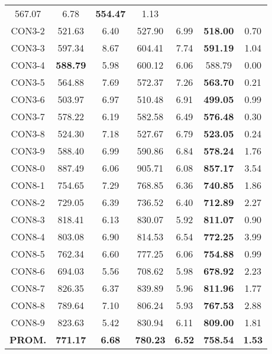 \begin{table}[ht]
\begin{tabular}{c c c c c c c}
567.07 & 6.78 & \bf{554.47} & 
1.13\\CON3-2 & 521.63 & 6.40 & 
527.90 & 6.99 & \bf{518.00} & 
0.70\\CON3-3 & 597.34 & 8.67 & 
604.41 & 7.74 & \bf{591.19} & 
1.04\\CON3-4 & \bf{588.79} & 5.98 & 
600.12 & 6.06 & 588.79 & 0.00\\
CON3-5 & 564.88 & 7.69 & 
572.37 & 7.26 & \bf{563.70} & 
0.21\\CON3-6 & 503.97 & 6.97 & 
510.48 & 6.91 & \bf{499.05} & 
0.99\\CON3-7 & 578.22 & 6.19 & 
582.58 & 6.49 & \bf{576.48} & 
0.30\\CON3-8 & 524.30 & 7.18 & 
527.67 & 6.79 & \bf{523.05} & 
0.24\\CON3-9 & 588.40 & 6.99 & 
590.86 & 6.84 & \bf{578.24} & 
1.76\\CON8-0 & 887.49 & 6.06 & 
905.71 & 6.08 & \bf{857.17} & 
3.54\\CON8-1 & 754.65 & 7.29 & 
768.85 & 6.36 & \bf{740.85} & 
1.86\\CON8-2 & 729.05 & 6.39 & 
736.52 & 6.40 & \bf{712.89} & 
2.27\\CON8-3 & 818.41 & 6.13 & 
830.07 & 5.92 & \bf{811.07} & 
0.90\\CON8-4 & 803.08 & 6.90 & 
814.53 & 6.54 & \bf{772.25} & 
3.99\\CON8-5 & 762.34 & 6.60 & 
777.25 & 6.06 & \bf{754.88} & 
0.99\\CON8-6 & 694.03 & 5.56 & 
708.62 & 5.98 & \bf{678.92} & 
2.23\\CON8-7 & 826.35 & 6.37 & 
839.89 & 5.96 & \bf{811.96} & 
1.77\\CON8-8 & 789.64 & 7.10 & 
806.24 & 5.93 & \bf{767.53} & 
2.88\\CON8-9 & 823.63 & 5.42 & 
830.94 & 6.11 & \bf{809.00} & 
1.81\\\bf{PROM.} & 
\bf{771.17} & \bf{6.68} & \bf{780.23} & \bf{6.52} & \bf{758.54} & \bf{1.53}\\[1ex]\hline
\end{tabular}
\label{table:nonlin}
\end{table} \clearpage
